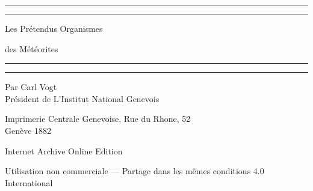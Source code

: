 \documentclass[a4paper, 12pt, oneside, french]{article}
\begin{document}
\begin{titlepage} %
	\centering %
	\scshape %

	
	\rule{\textwidth}{1.6pt}\vspace*{-\baselineskip}\vspace*{2pt} %
	\rule{\textwidth}{0.4pt} %
	
	\vspace{1.5\baselineskip} %
	
	{\LARGE Les Prétendus Organismes}

	\vspace{1.2\baselineskip}

	{\LARGE des Météorites}

	\vspace{1\baselineskip} %

	\rule{\textwidth}{0.4pt}\vspace*{-\baselineskip}\vspace{3.2pt} %
	\rule{\textwidth}{1.6pt} %
	
	\vspace{1\baselineskip} %
	
	
	{Par Carl Vogt\\ Président de L'Institut National Genevois} %
	
	\vspace*{1\baselineskip} %
	
    \vspace*{\fill}

	{\small\scshape }

    {Imprimerie Centrale Genevoise, Rue du Rhone, 52\\ Genève 1882} %
    
    Internet Archive Online Edition  %
	
	{Utilisation non commerciale --- Partage dans les mêmes conditions 4.0 International} %
\end{titlepage}
\setlength{\parskip}{1mm plus1mm minus1mm}
\clearpage
\frenchspacing
\listoffigures
\clearpage
\end{document}
